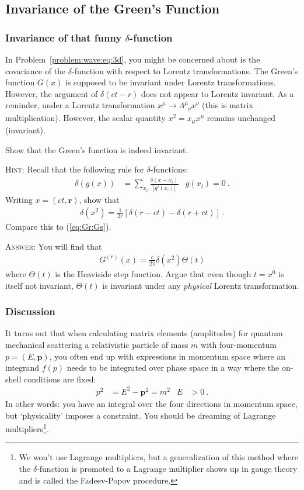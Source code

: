 \documentclass[12pt]{article}
\numberwithin{equation}{subsection}    %
\renewcommand{\vec}[1]{\mathbf{#1}} %
\begin{document}
\subsection{Invariance of the Green's Function}

\subsubsection{Invariance of that funny $\delta$-function}

In Problem~\ref{problem:wave:eq:3d}, you might be concerned about is the covariance of the $\delta$-function with respect to Lorentz transformations. The Green's function $G(x)$ is supposed to be invariant under Lorentz transformations. However, the argument of $\delta(ct - r)$ does not appear to Lorentz invariant. As a reminder, under a Lorentz transformation $x^\mu \to \Lambda^\mu_{\phantom\mu\nu}x^\nu$ (this is matrix multiplication). However, the scalar quantity $x^2 = x_\mu x^\mu$ remains unchanged (invariant).

Show that the Green's function is indeed invariant.


\textsc{Hint:} Recall that the following rule for $\delta$-functions:
\begin{align}
	\delta\left(g(x)\right) &= \sum_{x_i} \frac{\delta(x-x_i)}{|g'(x_i)|}
	&
	g(x_i) = 0 \ .
\end{align}
Writing $x = (ct,\vec r)$, show that
\begin{align}
	\delta(x^2) = \frac{1}{2r} \left[
	\delta(r-ct) - \delta(r+ct)
	\right] \ .
\end{align}
Compare this to (\ref{eq:Gr:Gs}). 

\textsc{Answer}: You will find that 
\begin{align}
	G^{(r)}(x) = \frac{c}{2\pi} \delta(x^2) \Theta(t)
\end{align}
where $\Theta(t)$ is the Heaviside step function. Argue that even though $t=x^0$ is itself not invariant, $\Theta(t)$ is invariant under any \emph{physical} Lorentz transformation. 


\subsubsection{Discussion}
It turns out that when calculating matrix elements (amplitudes) for quantum mechanical scattering a relativistic particle of mass $m$ with four-momentum $p = (E,\vec p)$, you often end up with expressions in momentum space where an integrand $f(p)$ needs to be integrated over phase space in a way where the on-shell conditions are fixed:
\begin{align}
	p^2 &= E^2 - \vec p^2 = m^2 
	&
	E &>0
	\ .
\end{align}
In other words: you have an integral over the four directions in momentum space, but `physicality' imposes a constraint. You should be dreaming of Lagrange multipliers\footnote{We won't use Lagrange multipliers, but a generalization of this method where the $\delta$-function is promoted to a Lagrange multiplier shows up in gauge theory and is called the Fadeev-Popov procedure.}. 
\end{document}
